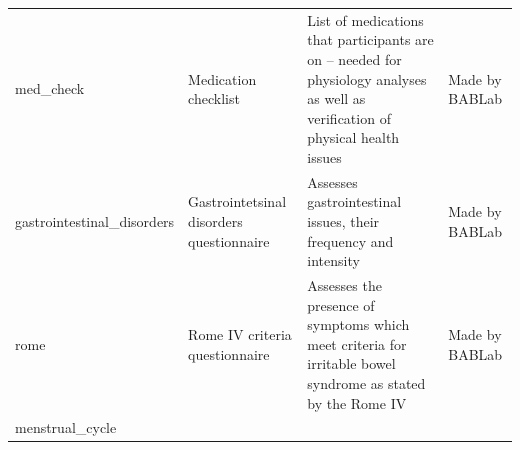 \documentclass[]{book}
\begin{document}
\begin{longtable}[]{@{}llll@{}}
\begin{minipage}[t]{0.22\columnwidth}\raggedright
med\_check\strut
\end{minipage} & \begin{minipage}[t]{0.27\columnwidth}\raggedright
Medication checklist\strut
\end{minipage} & \begin{minipage}[t]{0.22\columnwidth}\raggedright
List of medications that participants are on -- needed for physiology analyses as well as verification of physical health issues\strut
\end{minipage} & \begin{minipage}[t]{0.18\columnwidth}\raggedright
Made by BABLab\strut
\end{minipage}\tabularnewline
\begin{minipage}[t]{0.22\columnwidth}\raggedright
gastrointestinal\_disorders\strut
\end{minipage} & \begin{minipage}[t]{0.27\columnwidth}\raggedright
Gastrointetsinal disorders questionnaire\strut
\end{minipage} & \begin{minipage}[t]{0.22\columnwidth}\raggedright
Assesses gastrointestinal issues, their frequency and intensity\strut
\end{minipage} & \begin{minipage}[t]{0.18\columnwidth}\raggedright
Made by BABLab\strut
\end{minipage}\tabularnewline
\begin{minipage}[t]{0.22\columnwidth}\raggedright
rome\strut
\end{minipage} & \begin{minipage}[t]{0.27\columnwidth}\raggedright
Rome IV criteria questionnaire\strut
\end{minipage} & \begin{minipage}[t]{0.22\columnwidth}\raggedright
Assesses the presence of symptoms which meet criteria for irritable bowel syndrome as stated by the Rome IV\strut
\end{minipage} & \begin{minipage}[t]{0.18\columnwidth}\raggedright
Made by BABLab\strut
\end{minipage}\tabularnewline
\begin{minipage}[t]{0.22\columnwidth}\raggedright
menstrual\_cycle\strut
\end{minipage} & \begin{minipage}[t]{0.27\columnwidth}\raggedright

\end{minipage}
\end{longtable}
\end{document}
